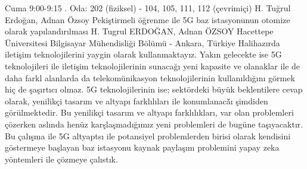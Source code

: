 
    \begin{abstract_basarim}
    {Cuma 9:00-9:15}
    {.}
    {Oda: 202 (fiziksel) - 104, 105, 111, 112 (çevrimiçi)}
    {H. Tuğrul Erdoğan, Adnan Özsoy}
    {Pekiştirmeli öğrenme ile 5G baz istasyonunun otomize olarak yapılandırılması}
    {%
    H. Tugrul ERDOĞAN, Adnan ÖZSOY}
    {%
    }
    {%
    Hacettepe Üniversitesi Bilgisayar Mühendisliği Bölümü - Ankara, Türkiye}
    Halihazırda iletişim teknolojilerini yaygin olarak kullanmaktayız. Yakın gelecekte ise 5G teknolojileri ile iletişim teknolojilerinin sunacağı yeni kapasite ve olanaklar ile de daha farkl alanlarda da telekomünikasyon teknolojilerinin kullanıldığını görmek hiç de şaşırtıcı olmaz. 5G teknolojilerinin ise; sektördeki büyük beklentilere cevap olarak, yenilikçi tasarım ve altyapı farklılıları ile konumlanacă̆ı şimdiden görülmektedir. Bu yenilikçi tasarım ve altyapı farklılıkları, var olan problemleri çözerken aslında henüz karşlaşmadığımız yeni problemleri de bugüne taşıyacaktır. Bu çalışma ile 5G altyaptsı ile potansiyel problemlerden birisi olarak kendisini göstermeye başlayan baz istasyonu kaynak paylaşım problemini yapay zeka yöntemleri ile çözmeye çalıstık. 
    
    \end{abstract_basarim}
    